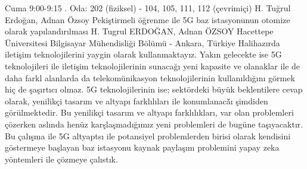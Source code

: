 
    \begin{abstract_basarim}
    {Cuma 9:00-9:15}
    {.}
    {Oda: 202 (fiziksel) - 104, 105, 111, 112 (çevrimiçi)}
    {H. Tuğrul Erdoğan, Adnan Özsoy}
    {Pekiştirmeli öğrenme ile 5G baz istasyonunun otomize olarak yapılandırılması}
    {%
    H. Tugrul ERDOĞAN, Adnan ÖZSOY}
    {%
    }
    {%
    Hacettepe Üniversitesi Bilgisayar Mühendisliği Bölümü - Ankara, Türkiye}
    Halihazırda iletişim teknolojilerini yaygin olarak kullanmaktayız. Yakın gelecekte ise 5G teknolojileri ile iletişim teknolojilerinin sunacağı yeni kapasite ve olanaklar ile de daha farkl alanlarda da telekomünikasyon teknolojilerinin kullanıldığını görmek hiç de şaşırtıcı olmaz. 5G teknolojilerinin ise; sektördeki büyük beklentilere cevap olarak, yenilikçi tasarım ve altyapı farklılıları ile konumlanacă̆ı şimdiden görülmektedir. Bu yenilikçi tasarım ve altyapı farklılıkları, var olan problemleri çözerken aslında henüz karşlaşmadığımız yeni problemleri de bugüne taşıyacaktır. Bu çalışma ile 5G altyaptsı ile potansiyel problemlerden birisi olarak kendisini göstermeye başlayan baz istasyonu kaynak paylaşım problemini yapay zeka yöntemleri ile çözmeye çalıstık. 
    
    \end{abstract_basarim}
    